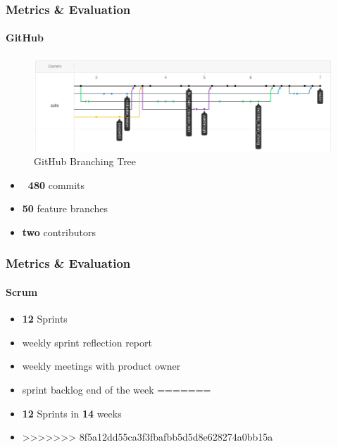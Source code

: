 \documentclass{beamer}
\begin{document}
\begin{frame}
\frametitle{Metrics \& Evaluation}
\framesubtitle{GitHub}
	\begin{figure}
		\includegraphics[scale=0.3]{./images/github_tree.png}
		\caption{GitHub Branching Tree}
	\end{figure}
	\begin{itemize}
		\item \textbf{~480} commits
		\item \textbf{50} feature branches
		\item \textbf{two} contributors
	\end{itemize}
\end{frame}

\begin{frame}
\frametitle{Metrics \& Evaluation}
\framesubtitle{Scrum}
	\begin{itemize}
<<<<<<< HEAD
	 \item \textbf{12} Sprints 
	 \item weekly sprint reflection report
	 \item weekly meetings with product owner
     \item sprint backlog end of the week		
=======
	 \item \textbf{12} Sprints in \textbf{14} weeks
	 \item 
>>>>>>> 8f5a12dd55ca3f3fbafbb5d5d8e628274a0bb15a
	\end{itemize}
\end{frame}
\end{document}
